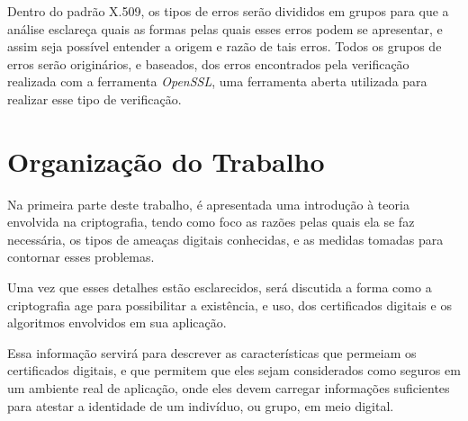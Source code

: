 	Dentro do padrão X.509, os tipos de erros serão divididos em grupos para que a análise esclareça quais as formas pelas quais esses erros podem se apresentar, e assim seja possível entender a origem e razão de tais erros. Todos os grupos de erros serão originários, e baseados, dos erros encontrados pela verificação realizada com a ferramenta \textit{OpenSSL}, uma ferramenta aberta utilizada para realizar esse tipo de verificação.

\section[Organização do Trabalho]{Organização do Trabalho}
	
	Na primeira parte deste trabalho, é apresentada uma introdução à teoria envolvida na criptografia, tendo como foco as razões pelas quais ela se faz necessária, os tipos de ameaças digitais conhecidas, e as medidas tomadas para contornar esses problemas.
	
	Uma vez que esses detalhes estão esclarecidos, será discutida a forma como a criptografia age para possibilitar a existência, e uso, dos certificados digitais e os algoritmos envolvidos em sua aplicação.
	
	Essa informação servirá para descrever as características que permeiam os certificados digitais, e que permitem que eles sejam considerados como seguros em um ambiente real de aplicação, onde eles devem carregar informações suficientes para atestar a identidade de um indivíduo, ou grupo, em meio digital.
